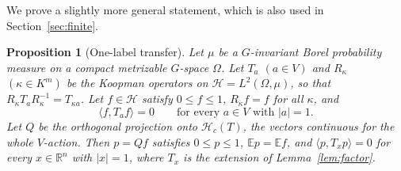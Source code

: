 \documentclass[11pt]{amsart}
\newtheorem{proposition}[theorem]{Proposition}
\theoremstyle{definition}
\newcommand{\R}{\mathbb{R}}
\newcommand{\cH}{\mathcal{H}}
\newcommand{\E}{\mathbb{E}}
\begin{document}
We prove a slightly more general statement, which is also used in Section~\ref{sec:finite}.

\begin{proposition}[One-label transfer]\label{prop:onelabel}
Let $\mu$ be a $G$-invariant Borel probability measure on a compact metrizable $G$-space $\Omega$. Let $T_a$ $(a\in V)$ and $R_\kappa$ $(\kappa\in K^m)$ be the Koopman operators on $\cH=L^2(\Omega,\mu)$, so that $R_\kappa T_aR_\kappa^{-1}=T_{\kappa a}$. Let $f\in\cH$ satisfy $0\le f\le 1$, $R_\kappa f=f$ for all $\kappa$, and
\[
\langle f,T_af\rangle=0\qquad\text{for every }a\in V\text{ with }|a|=1 .
\]
Let $Q$ be the orthogonal projection onto $\cH_c(T)$, the vectors continuous for the whole $V$-action. Then $p=Qf$ satisfies $0\le p\le 1$, $\E p=\E f$, and $\langle p,T_xp\rangle=0$ for every $x\in\R^n$ with $|x|=1$, where $T_x$ is the extension of Lemma~\ref{lem:factor}.
\end{proposition}
\end{document}
